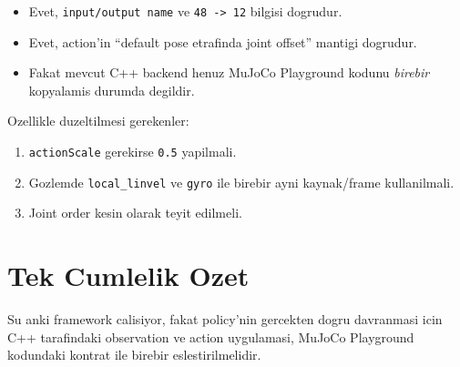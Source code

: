 \documentclass[11pt,a4paper]{article}
\begin{document}
  \begin{itemize}
  \item Evet, \texttt{input/output name} ve \texttt{48 -> 12} bilgisi dogrudur.
  \item Evet, action'in ``default pose etrafinda joint offset'' mantigi dogrudur.
  \item Fakat mevcut C++ backend henuz MuJoCo Playground kodunu \emph{birebir} kopyalamis durumda degildir.
  \end{itemize}

  Ozellikle duzeltilmesi gerekenler:

  \begin{enumerate}
  \item \texttt{actionScale} gerekirse \texttt{0.5} yapilmali.
  \item Gozlemde \texttt{local\_linvel} ve \texttt{gyro} ile birebir ayni kaynak/frame kullanilmali.
  \item Joint order kesin olarak teyit edilmeli.
  \end{enumerate}

  \section*{Tek Cumlelik Ozet}
  Su anki framework calisiyor, fakat policy'nin gercekten dogru davranmasi icin C++ tarafindaki observation ve action uygulamasi, MuJoCo Playground kodundaki kontrat ile birebir eslestirilmelidir.

  
\end{document}
